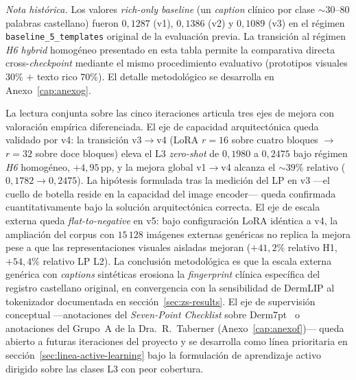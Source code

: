 \begin{table}[H]
\smallskip
\footnotesize
\textit{Nota histórica.} Los valores \emph{rich-only baseline} (un
\emph{caption} clínico por clase $\sim 30$--$80$ palabras
castellano) fueron $0{,}1287$ (v1), $0{,}1386$ (v2) y $0{,}1089$
(v3) en el régimen \texttt{baseline\_5\_templates} original de la
evaluación previa. La transición al régimen \emph{H6 hybrid}
homogéneo presentado en esta tabla permite la comparativa directa
cross-\emph{checkpoint} mediante el mismo procedimiento
evaluativo (prototipos visuales $30\%$ $+$ texto rico $70\%$). El
detalle metodológico se desarrolla en
Anexo~\ref{cap:anexog}.
\normalsize
\end{table}

La lectura conjunta sobre las cinco iteraciones articula tres
ejes de mejora con valoración empírica diferenciada. El eje de
capacidad arquitectónica queda validado por v4: la transición
v3$\to$v4 (LoRA $r=16$ sobre cuatro bloques $\to$ $r=32$ sobre
doce bloques) eleva el L3 \emph{zero-shot} de $0{,}1980$ a
$0{,}2475$ bajo régimen \emph{H6} homogéneo, $+4{,}95$\,pp, y la
mejora global v1$\to$v4 alcanza el $\sim 39\%$ relativo
($0{,}1782 \to 0{,}2475$). La hipótesis formulada tras la medición
del LP en v3 ---el cuello de botella reside en la capacidad del
image encoder--- queda confirmada cuantitativamente bajo la
solución arquitectónica correcta. El eje de escala externa queda
\emph{flat-to-negative} en v5: bajo configuración LoRA idéntica a
v4, la ampliación del corpus con $15\,128$ imágenes externas
genéricas no replica la mejora pese a que las representaciones
visuales aisladas mejoran ($+41{,}2\%$ relativo H1, $+54{,}4\%$
relativo LP L2). La conclusión metodológica es que la escala
externa genérica con \emph{captions} sintéticas erosiona la
\emph{fingerprint} clínica específica del registro castellano
original, en convergencia con la sensibilidad de DermLIP al
tokenizador documentada en secci\'on~\ref{sec:zs-results}. El eje de
supervisión conceptual ---anotaciones del \emph{Seven-Point
Checklist} sobre Derm7pt~\cite{kawahara2019} o anotaciones del
Grupo~A de la Dra.~R.~Taberner (Anexo~\ref{cap:anexof})---
queda abierto a futuras iteraciones del proyecto y se desarrolla
como línea prioritaria en
secci\'on~\ref{sec:linea-active-learning} bajo la formulación
de aprendizaje activo dirigido sobre las clases L3 con peor
cobertura.


